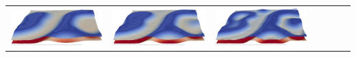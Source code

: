 \documentclass[a0,portrait]{a0poster}
\begin{document}
\begin{textblock}{15}
\begin{tabular*}{\textwidth}{@{\extracolsep{\fill}}lllllll}
	\includegraphics[width=2\TPHorizModule]{cas3p2_fluo0p8_GDL4_2_t092_crop_resized.jpg}&
	\includegraphics[width=2\TPHorizModule]{cas3p2_fluo0p8_GDL4_2_t125_crop_resized.jpg}&
	\includegraphics[width=2\TPHorizModule]{cas3p2_fluo0p8_GDL4_2_t260_crop_resized.jpg}\\
\end{tabular*}
\end{textblock}
\end{document}

